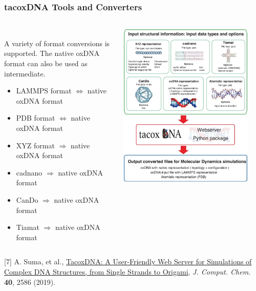 \documentclass[slidestop,compress,9pt]{beamer}
\begin{document}
\begin{frame}

\frametitle{tacoxDNA Tools and Converters}

\begin{columns}
\begin{column}{0.55\textwidth}
\vspace*{0.25cm}\\
A variety of format conversions is supported. The native oxDNA format can also be used as intermediate.
\vspace*{0.25cm}
\begin{itemize}
\setlength\itemsep{7pt}
\item LAMMPS format $\Leftrightarrow$ native oxDNA format
\item PDB format $\Leftrightarrow$ native oxDNA format
\item XYZ format $\Rightarrow$ native oxDNA format
\item cadnano $\Rightarrow$ native oxDNA format
\item CanDo $\Rightarrow$ native oxDNA format
\item Tiamat $\Rightarrow$ native oxDNA format
\end{itemize}
\end{column}

\begin{column}{0.45\textwidth}
\begin{center}
\includegraphics[width=0.90\textwidth]{tacoxDNA_schematic.jpg}
\end{center}
\end{column}
\end{columns}
\vspace*{0.25cm}
[7] A. Suma, et al., \href{https://doi.org/10.1002/jcc.26029}{TacoxDNA: A User-Friendly Web Server for Simulations of Complex DNA Structures, from Single Strands to Origami}, \textit{J. Comput. Chem.} \textbf{40}, 2586 (2019).


\end{frame}
\end{document}
